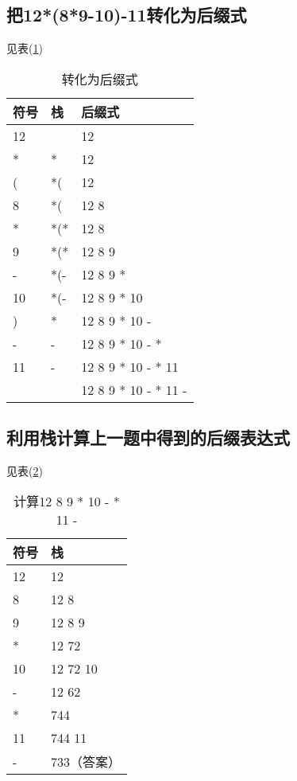 \documentclass[UTF8]{ctexart}
\begin{document}
\section{}%
	\subsection{把12*(8*9-10)-11转化为后缀式}
	见表(\ref{tablePost})
	\begin{table}
	\centering
	\caption{转化为后缀式}
	\label{tablePost}
	\begin{tabular}{|l|l|l|}
		\hline
		符号	&栈		&后缀式\\ \hline
		12		&		&12\\ \hline
		*		&*		&12\\ \hline
		(		&*(		&12\\ \hline
		8		&*(		&12 8\\ \hline
		*		&*(*	&12 8\\ \hline
		9		&*(*	&12 8 9\\ \hline
		-		&*(-	&12 8 9 *\\ \hline
		10		&*(-	&12 8 9 * 10\\ \hline
		)		&*		&12 8 9 * 10 -\\ \hline
		-		&-		&12 8 9 * 10 - *\\ \hline
		11		&-		&12 8 9 * 10 - * 11\\ \hline
				&		&12 8 9 * 10 - * 11 - \\ \hline
	\end{tabular}
	\end{table}
	\subsection{利用栈计算上一题中得到的后缀表达式}
	见表(\ref{tableCalc})
	\begin{table}
	\centering
	\caption{计算12 8 9 * 10 - * 11 -}
	\label{tableCalc}
	\begin{tabular}{|l|l|}
		\hline
		符号	&栈		\\ \hline
		12		&12		\\ \hline
		8		&12 8		\\ \hline
		9		&12 8 9	    \\ \hline
		*		&12 72		\\ \hline
		10		&12 72 10	\\ \hline
		-		&12 62	\\ \hline
		*		&744	\\ \hline
		11		&744 11	\\ \hline
		-		&733（答案）\\ \hline
	\end{tabular}
	\end{table}
\end{document}

